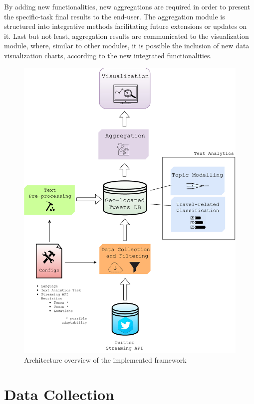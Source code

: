 By adding new functionalities, new aggregations are required in order to present the specific-task final results to the end-user. The aggregation module is structured into integrative methods facilitating future extensions or updates on it. Last but not least, aggregation results are communicated to the visualization module, where, similar to other modules, it is possible the inclusion of new data visualization charts, according to the new integrated functionalities.

\begin{figure}[htbp]
	\centering
	\includegraphics[width=\textwidth]{figures/architecture_2.pdf}
	\caption[Framework Architecture Overview]{Architecture overview of the implemented framework}
	\label{fig:architecture}
\end{figure}

\section{Data Collection}\label{sec:data_collection}


